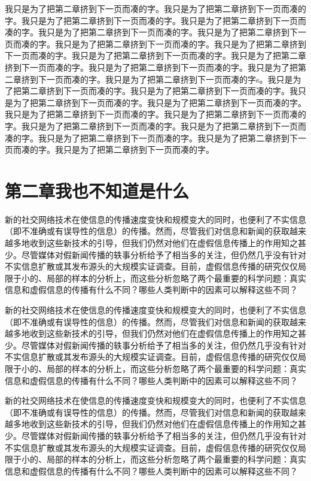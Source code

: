 \documentclass[a4paper,AutoFakeBold,oneside,12pt]{book}
\begin{document}
\begin{nopagenumber}
	我只是为了把第二章挤到下一页而凑的字。我只是为了把第二章挤到下一页而凑的字。我只是为了把第二章挤到下一页而凑的字。我只是为了把第二章挤到下一页而凑的字。我只是为了把第二章挤到下一页而凑的字。我只是为了把第二章挤到下一页而凑的字。我只是为了把第二章挤到下一页而凑的字。我只是为了把第二章挤到下一页而凑的字。我只是为了把第二章挤到下一页而凑的字。我只是为了把第二章挤到下一页而凑的字。我只是为了把第二章挤到下一页而凑的字。我只是为了把第二章挤到下一页而凑的字。我只是为了把第二章挤到下一页而凑的字s。我只是为了把第二章挤到下一页而凑的字。我只是为了把第二章挤到下一页而凑的字。我只是为了把第二章挤到下一页而凑的字。我只是为了把第二章挤到下一页而凑的字。我只是为了把第二章挤到下一页而凑的字。我只是为了把第二章挤到下一页而凑的字。我只是为了把第二章挤到下一页而凑的字。我只是为了把第二章挤到下一页而凑的字。我只是为了把第二章挤到下一页而凑的字。我只是为了把第二章挤到下一页而凑的字。我只是为了把第二章挤到下一页而凑的字。

	\newpage %
	\chapter*{第二章\quad{}我也不知道是什么}
	\newtranschapter

	新的社交网络技术在使信息的传播速度变快和规模变大的同时，也便利了不实信息（即不准确或有误导性的信息）的传播。然而，尽管我们对信息和新闻的获取越来越多地收到这些新技术的引导，但我们仍然对他们在虚假信息传播上的作用知之甚少。尽管媒体对假新闻传播的轶事分析给予了相当多的关注，但仍然几乎没有针对不实信息扩散或其发布源头的大规模实证调查。目前，虚假信息传播的研究仅仅局限于小的、局部的样本的分析上，而这些分析忽略了两个最重要的科学问题：真实信息和虚假信息的传播有什么不同？哪些人类判断中的因素可以解释这些不同？

	新的社交网络技术在使信息的传播速度变快和规模变大的同时，也便利了不实信息（即不准确或有误导性的信息）的传播。然而，尽管我们对信息和新闻的获取越来越多地收到这些新技术的引导，但我们仍然对他们在虚假信息传播上的作用知之甚少。尽管媒体对假新闻传播的轶事分析给予了相当多的关注，但仍然几乎没有针对不实信息扩散或其发布源头的大规模实证调查。目前，虚假信息传播的研究仅仅局限于小的、局部的样本的分析上，而这些分析忽略了两个最重要的科学问题：真实信息和虚假信息的传播有什么不同？哪些人类判断中的因素可以解释这些不同？

	新的社交网络技术在使信息的传播速度变快和规模变大的同时，也便利了不实信息（即不准确或有误导性的信息）的传播。然而，尽管我们对信息和新闻的获取越来越多地收到这些新技术的引导，但我们仍然对他们在虚假信息传播上的作用知之甚少。尽管媒体对假新闻传播的轶事分析给予了相当多的关注，但仍然几乎没有针对不实信息扩散或其发布源头的大规模实证调查。目前，虚假信息传播的研究仅仅局限于小的、局部的样本的分析上，而这些分析忽略了两个最重要的科学问题：真实信息和虚假信息的传播有什么不同？哪些人类判断中的因素可以解释这些不同？


\end{nopagenumber}
\end{document}
